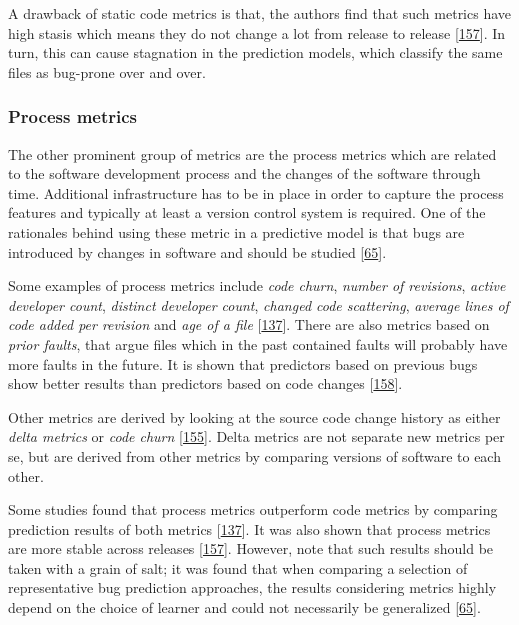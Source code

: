 \documentclass[]{book}
\begin{document}
A drawback of static code metrics is that, the authors find that such
metrics have high stasis which means they do not change a lot from
release to release {[}\protect\hyperlink{ref-Rahman2013}{157}{]}. In
turn, this can cause stagnation in the prediction models, which classify
the same files as bug-prone over and over.

\subsubsection{Process metrics}\label{process-metrics}

The other prominent group of metrics are the process metrics which are
related to the software development process and the changes of the
software through time. Additional infrastructure has to be in place in
order to capture the process features and typically at least a version
control system is required. One of the rationales behind using these
metric in a predictive model is that bugs are introduced by changes in
software and should be studied
{[}\protect\hyperlink{ref-DAmbros2012}{65}{]}.

Some examples of process metrics include \emph{code churn}, \emph{number
of revisions}, \emph{active developer count}, \emph{distinct developer
count}, \emph{changed code scattering}, \emph{average lines of code
added per revision} and \emph{age of a file}
{[}\protect\hyperlink{ref-Moser2008}{137}{]}. There are also metrics
based on \emph{prior faults}, that argue files which in the past
contained faults will probably have more faults in the future. It is
shown that predictors based on previous bugs show better results than
predictors based on code changes
{[}\protect\hyperlink{ref-rahman2011}{158}{]}.

Other metrics are derived by looking at the source code change history
as either \emph{delta metrics} or \emph{code churn}
{[}\protect\hyperlink{ref-Radjenovic2013}{155}{]}. Delta metrics are not
separate new metrics per se, but are derived from other metrics by
comparing versions of software to each other.

Some studies found that process metrics outperform code metrics by
comparing prediction results of both metrics
{[}\protect\hyperlink{ref-Moser2008}{137}{]}. It was also shown that
process metrics are more stable across releases
{[}\protect\hyperlink{ref-Rahman2013}{157}{]}. However, note that such
results should be taken with a grain of salt; it was found that when
comparing a selection of representative bug prediction approaches, the
results considering metrics highly depend on the choice of learner and
could not necessarily be generalized
{[}\protect\hyperlink{ref-DAmbros2012}{65}{]}.
\end{document}
